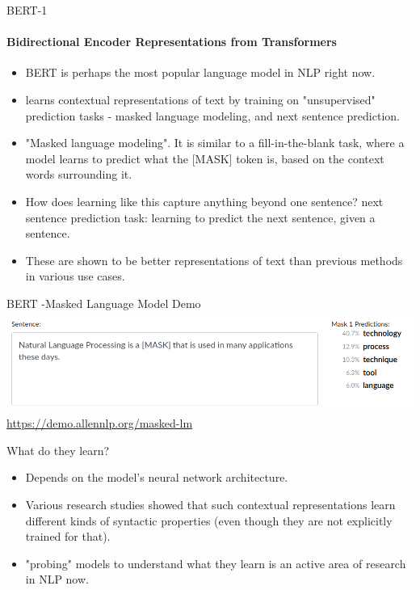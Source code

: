 \documentclass{beamer}
\begin{document}
\begin{frame}{BERT-1}
\framesubtitle{Bidirectional Encoder Representations from Transformers}
\begin{itemize}
    \item BERT is perhaps the most popular language model in NLP right now.
    \item learns contextual representations of text by training on "unsupervised" prediction tasks - masked language modeling, and next sentence prediction. \pause
    \item "Masked language modeling". It is similar to a fill-in-the-blank task, where a model learns to predict what the [MASK] token is, based on the context words surrounding it.
    \item  How does learning like this capture anything beyond one sentence? next sentence prediction task: learning to predict the next sentence, given a sentence. \pause
    \item These are shown to be better representations of text than previous methods in various use cases.
\end{itemize}
\end{frame}

\begin{frame}{BERT -Masked Language Model Demo}
    \includegraphics[width=\textwidth]{figures/bertallen.png}
    \url{https://demo.allennlp.org/masked-lm}
\end{frame}

\begin{frame}{What do they learn?}
    \begin{itemize}
        \item Depends on the model's neural network architecture.
        \item Various research studies showed that such contextual representations learn different kinds of syntactic properties (even though they are not explicitly trained for that).
        \item "probing" models to understand what they learn is an active area of research in NLP now. 
    \end{itemize}
\end{frame}
\end{document}
